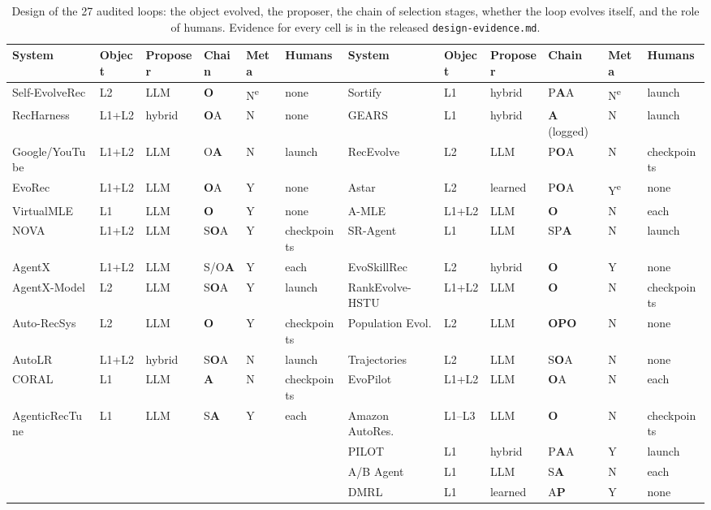\documentclass[sigconf,nonacm]{acmart}
\newcommand{\yes}{\textsf{Y}\xspace}
\newcommand{\no}{\textsf{N}\xspace}
\begin{document}
\begin{table}[t]
\caption{Design of the 27 audited loops: the object evolved, the proposer, the chain of selection stages, whether the loop evolves itself, and the role of humans. Evidence for every cell is in the released
\texttt{design-evidence.md}.}\label{tab:design}
\small
\begin{tabular}{@{}llllll@{\hskip 18pt}llllll@{}}
\toprule
System & Object & Proposer & Chain & Meta & Humans & System & Object & Proposer & Chain & Meta & Humans \\
\midrule
Self-EvolveRec & L2 & LLM & \textbf{O} & \no\textsuperscript{e} & none & Sortify & L1 & hybrid & P\textbf{A}A & \no\textsuperscript{e} & launch \\
RecHarness & L1+L2 & hybrid & \textbf{O}A & \no & none & GEARS & L1 & hybrid & \textbf{A} (logged) & \no & launch \\
Google/YouTube & L1+L2 & LLM & O\textbf{A} & \no & launch & RecEvolve & L2 & LLM & P\textbf{O}A & \no & checkpoints \\
EvoRec & L1+L2 & LLM & \textbf{O}A & \yes & none & Astar & L2 & learned & P\textbf{O}A & \yes\textsuperscript{e} & none \\
VirtualMLE & L1 & LLM & \textbf{O} & \yes & none & A-MLE & L1+L2 & LLM & \textbf{O} & \no & each \\
NOVA & L1+L2 & LLM & S\textbf{O}A & \yes & checkpoints & SR-Agent & L1 & LLM & SP\textbf{A} & \no & launch \\
AgentX & L1+L2 & LLM & S/O\textbf{A} & \yes & each & EvoSkillRec & L2 & hybrid & \textbf{O} & \yes & none \\
AgentX-Model & L2 & LLM & S\textbf{O}A & \yes & launch & RankEvolve-HSTU & L1+L2 & LLM & \textbf{O} & \no & checkpoints \\
Auto-RecSys & L2 & LLM & \textbf{O} & \yes & checkpoints & Population Evol. & L2 & LLM & \textbf{OPO} & \no & none \\
AutoLR & L1+L2 & hybrid & S\textbf{O}A & \no & launch & Trajectories & L2 & LLM & S\textbf{O}A & \no & none \\
CORAL & L1 & LLM & \textbf{A} & \no & checkpoints & EvoPilot & L1+L2 & LLM & \textbf{O}A & \no & each \\
AgenticRecTune & L1 & LLM & S\textbf{A} & \yes & each & Amazon AutoRes. & L1--L3 & LLM & \textbf{O} & \no & checkpoints \\
& & & & & & PILOT & L1 & hybrid & P\textbf{A}A & \yes & launch \\
& & & & & & A/B Agent & L1 & LLM & S\textbf{A} & \no & each \\
& & & & & & DMRL & L1 & learned & A\textbf{P} & \yes & none \\
\bottomrule
\end{tabular}


\end{table}
\end{document}
